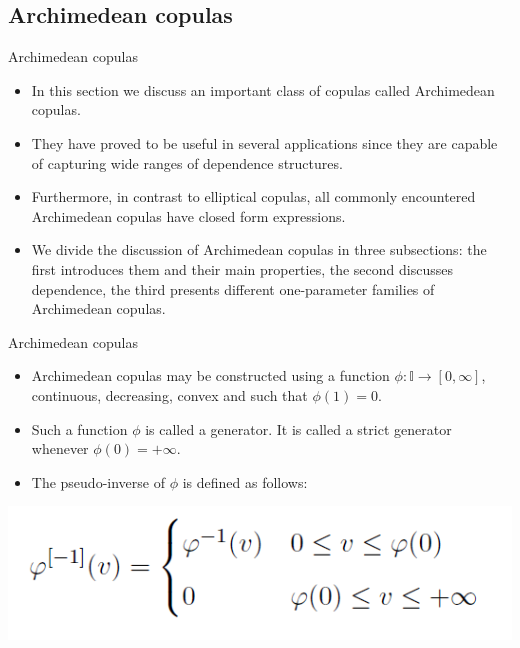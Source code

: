 \documentclass[11pt]{beamer}
\theoremstyle{plain}
\theoremstyle{definition}
\theoremstyle{remark}
\begin{document}
\subsection{Archimedean copulas}
%
\begin{frame}{Archimedean copulas}
   \begin{itemize}
      \item In this section we discuss an important class of copulas called Archimedean copulas. 
      \item They have proved to be useful in several applications since they are capable of capturing wide ranges of dependence 
      structures. 
      \item Furthermore, in contrast to elliptical copulas, all commonly encountered Archimedean copulas have closed form expressions.
      \item We divide the discussion of Archimedean copulas in three subsections: the first introduces them and their main properties, 
      the second discusses dependence, the third presents different one-parameter families of Archimedean copulas.
\end{itemize}
\end{frame}
%
\begin{frame}{Archimedean copulas}
\begin{itemize}
\item
Archimedean copulas may be constructed using a function $\phi : \mathbb{I} \rightarrow [0, \infty]$, 
continuous, decreasing, convex and such that $\phi(1) = 0$. 
\item
Such a function $\phi$ is called a generator. It is called a strict generator whenever $\phi(0) = +\infty$. 
\item
The pseudo-inverse of $\phi$ is defined as follows:
\end{itemize}
\begin{center}
\includegraphics[scale=.5]{fig/copule_archimedee_pseudoinv.PNG} 
\end{center}
\end{frame}
\end{document}
